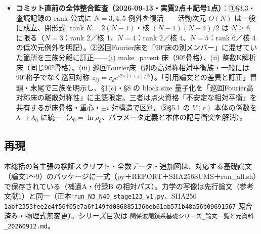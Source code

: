 \documentclass[
  a4paper,
]{ltjsarticle}
\begin{document}
\begin{itemize}
  \(\gamma_t\) は別量、\(N=6,8,10\) で
  \(\gamma_t>\lambda_0\)、一般証明なし」に分離。Jacobian 側の記法を
  \(\rho_0=\rho(J_0),\lambda_0\) に統一（\(iK\) の \(\mu\)
  との衝突を本文で解消）。⑤§7 の恒等式
  \(H_\perp(t)/H=\tfrac14\|\Pi_t-\Pi_0\|_F^2\) を全時刻で明記し
  \(\|\Pi_t-\Pi_0\|_F\propto e^{\gamma_t t}\)
  を導出済みとして強化。⑥§9「最大対称な単一コヒーレントモード」→「90°骨格の自己無撞着な単一コヒーレント相対平衡」、§10
  Trefethen--Embree
  を時変接線コサイクル基準に更新。⑦旧節番号参照（因数分解
  §3.4→§3.5、\(N=3\) 例外 §3.6→§3.7、補遺100桁
  §3.5→§3.6）を同期。タイトルを現在地（局所不安定→インフレ→SSB→Grassmann→終端普遍性→関係主義）に更新。
\item
  \textbf{コミット直前の全体整合監査（2026-09-13・実質2点＋記号1点）}：①§3.3・査読記録の
  rank 公式に \(N=3,4,5\) 例外を復活------活動次元 \(O(N)\)
  は一般に成立、閉形式 \(\operatorname{rank}K=2(N-1)\)・核
  \((N-1)(N-4)/2\) は \(N\ge6\) に限る（\(N=3\)：rank 2／核
  1、\(N=4\)：rank 2／核 4、\(N=5\)：rank 6／核 4
  の低次元例外を明記）。②巡回Fourier床を「90°床の別メンバー」に混ぜていた箇所を三族分離に訂正------(i)
  make\_parent 床（90°骨格）、(ii) 整数K解析床（同じ90°骨格）、(iii)
  巡回Fourier床（別の高対称相対平衡族・一般には90°格子でなく巡回対称
  \(z_{ij}=r_de^{i2\pi(i+j)/N}\)）。「引用論文との差異と訂正」冒頭・末尾で三族を明示し、§1(c)・§8
  の block size
  量子化を「巡回Fourier高対称床の離散対称性」に主語限定。三者は点火資格「不安定な相対平衡」を共有するが床骨格・重心・\(\pm i\)
  対構造で区別。③§5.1 の \(V(r)\) 本体の係数を \(\lambda\to\lambda_0\)
  に統一（\(\lambda_0=\ln\rho_0\)、パラメータ定義と本体の記号衝突を解消）。
\end{itemize}

\subsection{再現}\label{ux518dux73fe}

本総括の各主張の検証スクリプト・全数データ・追加図は、対応する基礎論文（論文1〜9）のパッケージに一式（py＋REPORT＋SHA256SUMS＋run\_all.sh）で保存されている（補遺A・付録B
の相対パス）。力学の写像は先行論文（参考文献1）と同一（正本
\texttt{run\_N3\_N40\_stage123\_v1.py}、SHA256
\texttt{1abf2353fee2e4f56f05e7a6f149fd086885136beb61ab571b48a56b09691567}
照合済み・物理式無変更）。シリーズ目次は
\texttt{関係波閉鎖系基礎シリーズ\_論文一覧と元資料\_20260912.md}。
\end{document}
